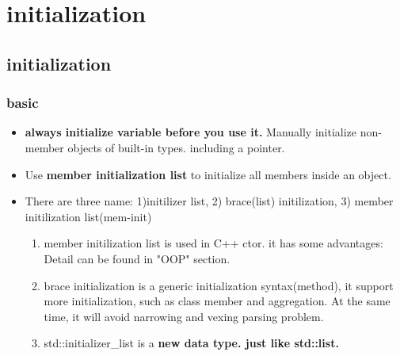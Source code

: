 \documentclass[a4paper,12pt,twoside]{book}
\begin{document}
\chapter{initialization}
\section{initialization}

\subsection{basic}
\begin{itemize}
	\item \textbf{always initialize variable before you use it.} Manually initialize non-member objects of built-in types. including a pointer.
	
	\item Use \textbf{member initialization list} to initialize all members inside an object.
		\item There are three name: 1)initilizer list, 2) brace(list) initilization, 3) member initilization list(mem-init)
	\begin{enumerate}
		\item member initilization list is used in C++ ctor. it has some advantages: Detail can be found in "OOP" section. 
		
		\item brace initialization is a generic initialization syntax(method), it support more initialization, such as class member and aggregation. At the same time, it will avoid narrowing and vexing parsing problem. 
		
		\item std::initializer\_list is a \textbf{new data type. just like std::list.}
	\end{enumerate}
\end{itemize}
\end{document}
